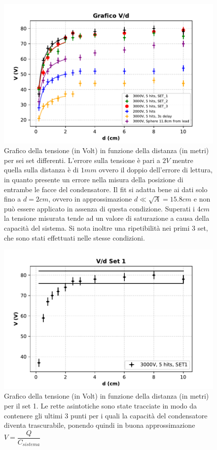 {\fontsize{12}{14}\selectfont 
\begin{figure}[H]
  \centering
  \includegraphics[width=14.5cm]{Figures/Grafico_Parte1.pdf}
  \caption{Grafico della tensione (in Volt) in funzione della distanza (in metri) per sei set differenti. L'errore sulla tensione è pari a $2 V$ mentre quella sulla distanza è di $1 mm$ ovvero il doppio dell'errore di lettura, in quanto presente un errore nella misura della posizione di entrambe le facce del condensatore. Il fit si adatta bene ai dati solo fino a $d = 2 cm$, ovvero in approssimazione $d \ll \sqrt{A} = 15.8 cm$ e non può essere applicato in assenza di questa condizione. Superati i $4cm$ la tensione misurata tende ad un valore di saturazione a causa della capacità del sistema. Si nota inoltre una ripetibilità nei primi 3 set, che sono stati effettuati nelle stesse condizioni.}
  \label{fig:GraficoParteI}
\end{figure}

\begin{figure}[H]
  \centering
  \includegraphics[width=11.5cm]{Figures/Grafico_Parte1_SET1.pdf}
  \caption{Grafico della tensione (in Volt) in funzione della distanza (in metri) per il set 1. Le rette asintotiche sono state tracciate in modo da contenere gli ultimi 3 punti per i quali la capacità del condensatore diventa trascurabile, ponendo quindi in buona approssimazione $V = \dfrac{Q}{C_{sistema}}$}
  \label{fig:parteIset1}
\end{figure}

}
